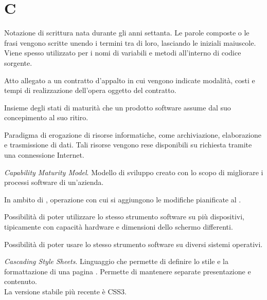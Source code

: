 
\section{C}

Notazione di scrittura nata durante gli anni settanta. Le parole composte o le frasi vengono scritte unendo i termini tra di loro, lasciando le iniziali maiuscole. Viene spesso utilizzato per i nomi di variabili e metodi all'interno di codice sorgente.


Atto allegato a un contratto d'appalto in cui vengono indicate modalità, costi e tempi di realizzazione dell'opera oggetto del contratto.

Insieme degli stati di maturità che un prodotto software assume dal suo concepimento al suo ritiro.

Paradigma di erogazione di risorse informatiche, come archiviazione, elaborazione e trasmissione di dati. Tali risorse vengono rese disponibili su richiesta tramite una connessione Internet.

\textit{Capability Maturity Model}. Modello di sviluppo creato con lo scopo di migliorare i processi software di un'azienda.


In ambito di , operazione con cui si aggiungono le modifiche pianificate al . 

Possibilità di poter utilizzare lo stesso strumento software su più dispositivi, tipicamente con capacità hardware e dimensioni dello schermo differenti.

Possibilità di poter usare lo stesso strumento software su diversi sistemi operativi.

\textit{Cascading Style Sheets}. Linguaggio che permette di definire lo stile e la formattazione di una pagina . Permette di mantenere separate presentazione e contenuto. \\
La versione stabile più recente è CSS3.

